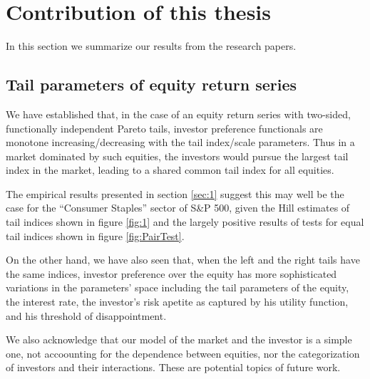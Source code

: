  
\section{Contribution of this thesis}\label{sec:contr}

In this section we summarize our results from the research papers.

\subsection{Tail parameters of equity return series}
We have established that, in the case of an equity return series with
two-sided, functionally independent Pareto tails, investor
preference functionals are monotone increasing/decreasing with the
tail index/scale parameters. Thus in a market dominated by such
equities, the investors would pursue the largest tail index in the
market, leading to a shared common tail index for all equities.

The empirical results presented in section \ref{sec:1} suggest this
may well be the case for the ``Consumer Staples'' sector of S\&P 500,
given the Hill estimates of tail indices shown in figure \ref{fig:1}
and the largely positive results of tests for equal tail indices shown
in figure \ref{fig:PairTest}.

On the other hand, we have also seen that, when the left and the right
tails have the same indices, investor preference over the equity has
more sophisticated variations in the parameters' space including the
tail parameters of the equity, the interest rate, the investor's risk
apetite as captured by his utility function, and his threshold of
disappointment.

We also acknowledge that our model of the market and the investor is a
simple one, not accoounting for the dependence between equities, nor
the categorization of investors and their interactions. These are
potential topics of future work.

